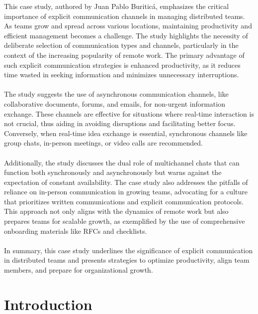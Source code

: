 \documentclass[12pt]{article}
\begin{document}
This case study, authored by Juan Pablo Buriticá, emphasizes the critical importance of explicit communication channels in managing distributed teams. As teams grow and spread across various locations, maintaining productivity and efficient management becomes a challenge. The study highlights the necessity of deliberate selection of communication types and channels, particularly in the context of the increasing popularity of remote work. The primary advantage of such explicit communication strategies is enhanced productivity, as it reduces time wasted in seeking information and minimizes unnecessary interruptions.\\
\\The study suggests the use of asynchronous communication channels, like collaborative documents, forums, and emails, for non-urgent information exchange. These channels are effective for situations where real-time interaction is not crucial, thus aiding in avoiding disruptions and facilitating better focus. Conversely, when real-time idea exchange is essential, synchronous channels like group chats, in-person meetings, or video calls are recommended.\\
\\Additionally, the study discusses the dual role of multichannel chats that can function both synchronously and asynchronously but warns against the expectation of constant availability. The case study also addresses the pitfalls of reliance on in-person communication in growing teams, advocating for a culture that prioritizes written communications and explicit communication protocols. This approach not only aligns with the dynamics of remote work but also prepares teams for scalable growth, as exemplified by the use of comprehensive onboarding materials like RFCs and checklists.\\
\\In summary, this case study underlines the significance of explicit communication in distributed teams and presents strategies to optimize productivity, align team members, and prepare for organizational growth.

\newpage

\section{Introduction}
\end{document}
